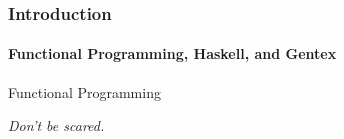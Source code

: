 \begin{frame}
  \frametitle{Introduction}
  \framesubtitle{Functional Programming, Haskell, and Gentex}

  \center

  \huge
  Functional Programming

  \normalsize
  \emph{Don't be scared.}
\end{frame}
